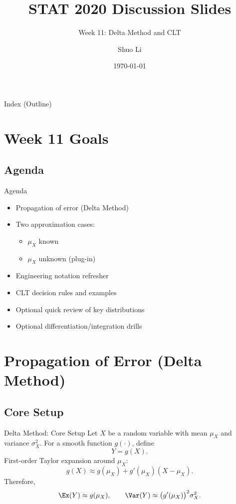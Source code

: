 \documentclass[aspectratio=169]{beamer}
\title[STAT 2020 Week 11 \hfill \insertframenumber/\inserttotalframenumber]{STAT 2020 Discussion Slides}
\subtitle{Week 11: Delta Method and CLT}
\author{Shuo Li}
\institute{University of Iowa}
\date{\today}
\begin{document}
\begin{frame}
  \titlepage
\end{frame}

\begin{frame}{Index (Outline)}
  \tableofcontents[hideallsubsections]
\end{frame}

\section{Week 11 Goals}

\subsection{Agenda}
\begin{frame}{Agenda}
  \begin{itemize}
    \item Propagation of error (Delta Method)
    \item Two approximation cases:
    \begin{itemize}
      \item \(\mu_X\) known
      \item \(\mu_X\) unknown (plug-in)
    \end{itemize}
    \item Engineering notation refresher
    \item CLT decision rules and examples
    \item Optional quick review of key distributions
    \item Optional differentiation/integration drills
  \end{itemize}
\end{frame}

\section{Propagation of Error (Delta Method)}

\subsection{Core Setup}
\begin{frame}{Delta Method: Core Setup}
  Let \(X\) be a random variable with mean \(\mu_X\) and variance \(\sigma_X^2\).
  For a smooth function \(g(\cdot)\), define
  \[
    Y = g(X).
  \]
  First-order Taylor expansion around \(\mu_X\):
  \[
    g(X)\approx g(\mu_X)+g'(\mu_X)(X-\mu_X).
  \]
  Therefore,
  \[
    \Ex(Y)\approx g(\mu_X),\qquad
    \Var(Y)\approx \big(g'(\mu_X)\big)^2\sigma_X^2.
  \]
\end{frame}
\end{document}
